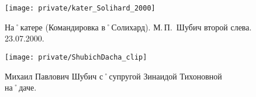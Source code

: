 \begin{figure}[h]
\texttt{[image: private/kater\_Solihard\_2000]}
\caption{На˚катере (Командировка в˚Солихард). М.\,П.~Шубич второй слева. 23.07.2000.}
\label{fig:kater_Solihard_2000}
\end{figure}

\begin{figure}[h]
\texttt{[image: private/ShubichDacha\_clip]}
\caption{Михаил Павлович Шубич с˚супругой Зинаидой Тихоновной на˚даче.}
\label{fig:ShubichDacha_clip}
\end{figure}



